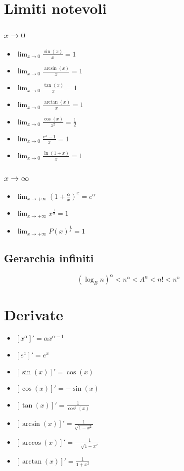 \documentclass[11pt]{article}
\theoremstyle{definition}
\theoremstyle{remark}
\begin{document}
\section*{Limiti notevoli}
\subsubsection*{$x\to 0$}
\begin{itemize}
    \item $\lim_{x\to0} \frac{\sin(x)}{x}=1$
    \item $\lim_{x\to0} \frac{\arcsin(x)}{x}=1$
    \item $\lim_{x\to0} \frac{\tan(x)}{x}=1$
    \item $\lim_{x\to0} \frac{\arctan(x)}{x}=1$
    \item $\lim_{x\to0} \frac{\cos(x)}{x^2}= \frac{1}{2}$
    \item $\lim_{x\to0} \frac{e^x-1}{x}=1$
    \item $\lim_{x\to0} \frac{\ln(1+x)}{x}=1$
\end{itemize}

\subsubsection*{$x\to \infty$}
\begin{itemize}
    \item $\lim_{x\to+\infty}(1+ \frac{\alpha}{x})^x=e^\alpha$
    \item $\lim_{x\to+\infty}{x^{ \frac{1}{x}}}=1$
    \item $\lim_{x\to+\infty}P(x)^{ \frac{1}{x}}=1$
\end{itemize}

\subsection*{Gerarchia infiniti}
\begin{equation*}
    (\log_Bn)^\alpha < n^\alpha < A^n < n! < n^n
\end{equation*}

\section*{Derivate}
\begin{itemize}
    \item $[ x^{\alpha}]'=\alpha x^{\alpha - 1}$
    \item $[ e^x ]'= e^x$
    \item $[ \sin(x)]'=\cos(x)$
    \item $[ \cos(x)]'=-\sin(x)$
    \item $[ \tan(x)]'= \frac{1}{\cos^2(x)}$
    \item $[ \arcsin(x)]'= \frac{1}{\sqrt{1-x^2}}$
    \item $[ \arccos(x)]'= -\frac{1}{\sqrt{1-x^2}}$
    \item $[ \arctan(x)]'=\frac{1}{1+x^2}$
\end{itemize}
\end{document}
